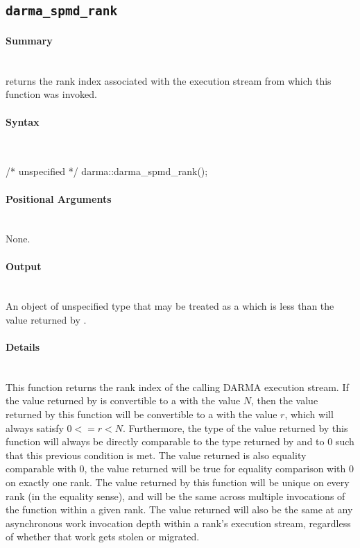 


\subsection{\texttt{darma\_spmd\_rank}}

\paragraph{Summary}\mbox{}\\
 returns the \gls{rank} index associated with the
\gls{execution stream} from which this function was invoked.

\paragraph{Syntax}\mbox{}\\
\begin{CppCode}
/* unspecified */ darma::darma_spmd_rank();
\end{CppCode}

\paragraph{Positional Arguments} \mbox{}\\
None. 

\paragraph{Output}\mbox{}\\
An object of unspecified type that may be treated as a 
which is less than the value returned by .

\paragraph{Details}\mbox{}\\
This function returns the \gls{rank} index of the calling \gls{DARMA} \gls{execution
stream}.  If the value returned
by  is convertible to a  with the
value $N$, then the value returned by this function will be convertible to a
 with the value $r$, which will always satisfy $0 <=
r < N$.  Furthermore, the type of the value returned by this function will
always be directly comparable to the type returned by 
and to $0$ such that this previous condition is met.  The value returned is also
equality comparable with $0$, the value returned will be true for equality
comparison with $0$ on exactly one rank.  The value returned by this function
will be unique on every \gls{rank} (in the equality sense), and will be the same
across multiple invocations of the function within a given \gls{rank}.  The value
returned will also be the same at any asynchronous work invocation depth within
a \gls{rank}'s \gls{execution stream}, regardless of whether that work gets stolen or
migrated.

